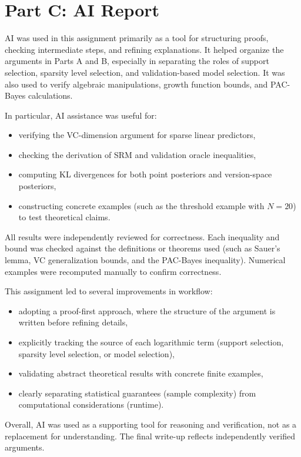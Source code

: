 \documentclass[11pt]{article}
\begin{document}
\section{Part C: AI Report}
\begin{solutionbox}

AI was used in this assignment primarily as a tool for structuring proofs, checking intermediate steps, and refining explanations. It helped organize the arguments in Parts A and B, especially in separating the roles of support selection, sparsity level selection, and validation-based model selection. It was also used to verify algebraic manipulations, growth function bounds, and PAC-Bayes calculations.

In particular, AI assistance was useful for:
\begin{itemize}
\item verifying the VC-dimension argument for sparse linear predictors,
\item checking the derivation of SRM and validation oracle inequalities,
\item computing KL divergences for both point posteriors and version-space posteriors,
\item constructing concrete examples (such as the threshold example with $N=20$) to test theoretical claims.
\end{itemize}

All results were independently reviewed for correctness. Each inequality and bound was checked against the definitions or theorems used (such as Sauer’s lemma, VC generalization bounds, and the PAC-Bayes inequality). Numerical examples were recomputed manually to confirm correctness.

This assignment led to several improvements in workflow:
\begin{itemize}
\item adopting a proof-first approach, where the structure of the argument is written before refining details,
\item explicitly tracking the source of each logarithmic term (support selection, sparsity level selection, or model selection),
\item validating abstract theoretical results with concrete finite examples,
\item clearly separating statistical guarantees (sample complexity) from computational considerations (runtime).
\end{itemize}

Overall, AI was used as a supporting tool for reasoning and verification, not as a replacement for understanding. The final write-up reflects independently verified arguments.

\end{solutionbox}
\end{document}
